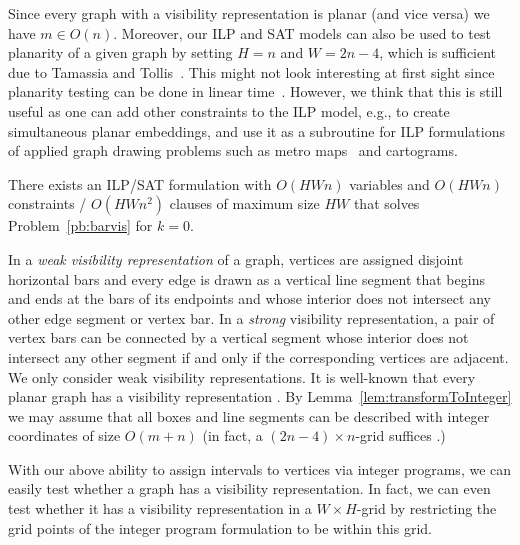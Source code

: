 \documentclass[runningheads]{llncs}
\newcounter{constr}
\begin{document}
Since every graph with a visibility representation is planar (and vice versa) we have $m \in
O(n)$. Moreover, our ILP and SAT models can also be used to test planarity of a
given graph by setting $H= n$ and $W= 2n-4$, which is sufficient due to Tamassia and Tollis~\cite{TT86}. This might not look interesting at first sight since planarity testing can be done in linear time~\cite{planarityTest}. However, we think that this is still useful as one can add other constraints to the ILP model, e.g., 
to create simultaneous planar embeddings, and use it as a subroutine for ILP formulations of applied graph drawing problems
such as metro maps~\cite{nw-dlhqm-11} and cartograms.



\begin{theorem}\label{thm:barvis}
	There exists an ILP/SAT formulation with $O(HWn)$ variables and
$O(HWn)$ constraints / $O (H W n^2)$ clauses of maximum size $HW$ 
that solves Problem~\ref{pb:barvis} for $k=0$. 
\end{theorem}



\iffalse


In a {\em weak visibility representation} of a graph,
vertices are assigned disjoint horizontal bars and
every edge is drawn as a vertical line segment that begins and
ends at the bars of its endpoints and whose interior does not intersect any
other edge segment or vertex bar.
In a {\em strong} visibility representation,
a pair of vertex bars can be connected by a vertical segment
whose interior does not intersect any other segment 
if and only if the corresponding vertices are adjacent.
We only consider weak visibility representations.
It is well-known that every planar graph has a visibility 
representation \cite{Wis85,TT86,RT86}.  
By Lemma~\ref{lem:transformToInteger} we
may assume that all boxes and line segments can be described
with integer coordinates of size $O(m+n)$ (in fact, a
$(2n-4)\times n$-grid suffices \cite{TT86}.)

With our above ability to assign intervals to vertices via integer
programs, we can easily test whether a graph has a visibility
representation.  In fact, we can even test whether it has a 
visibility representation in a $W\times H$-grid by restricting
the grid points of the integer program formulation to be within this grid.
\end{document}
